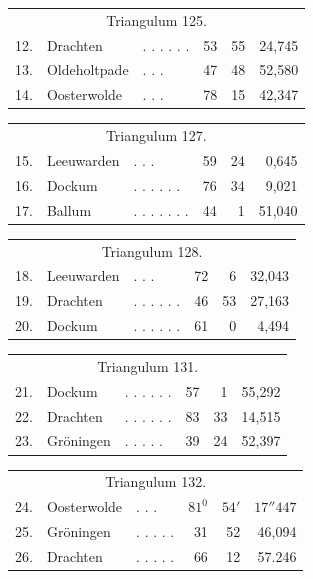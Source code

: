 \begin{center}
\begin{tabular}{r l l r r r}
\multicolumn{6}{c}{Triangulum 125.}\\[5pt]
12.&Drachten&. . . . . .&53&55&24,745\\
13.&Oldeholtpade&. . .&47&48&52,580\\
14.&Oosterwolde&. . .&78&15&42,347
\end{tabular}
\end{center}
\begin{center}
\begin{tabular}{r l l r r r}
\multicolumn{6}{c}{Triangulum 127.}\\[5pt]
15.&Leeuwarden&. . .&59&24&0,645\\
16.&Dockum&. . . . . .&76&34&9,021\\
17.&Ballum&. . . . . . .&44&1&51,040
\end{tabular}
\end{center}
\begin{center}
\begin{tabular}{r l l r r r}
\multicolumn{6}{c}{Triangulum 128.}\\[5pt]
18.&Leeuwarden&. . .&72&6&32,043\\
19.&Drachten&. . . . . .&46&53&27,163\\
20.&Dockum&. . . . . .&61&0&4,494
\end{tabular}
\end{center}
\begin{center}
\begin{tabular}{r l l r r r}
\multicolumn{6}{c}{Triangulum 131.}\\[5pt]
21.&Dockum&. . . . . .&57&1&55,292\\
22.&Drachten&. . . . . .&83&33&14,515\\
23.&Gröningen&. . . . .&39&24&52,397
\end{tabular}
\end{center}
\begin{center}
\begin{tabular}{r l l r r r}
\multicolumn{6}{c}{Triangulum 132.}\\[5pt]
24.&Oosterwolde&. . .&\(81^0\)&\(54'\)&\(17''447\)\\
25.&Gröningen&. . . . .&31&52&46,094\\
26.&Drachten&. . . . .&66&12&57.246
\end{tabular}
\end{center}

